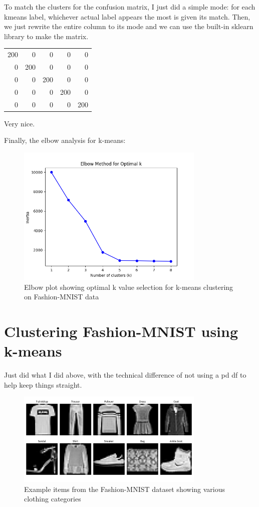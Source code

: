 \documentclass[letterpaper, 11pt]{amsart}
\begin{document}
To match the clusters for the confusion matrix, I just did a simple mode: for each kmeans label, whichever actual label appears the most is given its match.
Then, we just rewrite the entire column to its mode and we can use the built-in sklearn library to make the matrix.

\begin{tabular}{rrrrr}
\toprule
\midrule
200 & 0 & 0 & 0 & 0 \\
0 & 200 & 0 & 0 & 0 \\
0 & 0 & 200 & 0 & 0 \\
0 & 0 & 0 & 200 & 0 \\
0 & 0 & 0 & 0 & 200 \\
\bottomrule
\end{tabular}

Very nice.

Finally, the elbow analysis for k-means:
\begin{figure}[h]
\centering
\includegraphics[width=0.8\textwidth]{plots/elbow_plot.png}
\caption{Elbow plot showing optimal k value selection for k-means clustering on Fashion-MNIST data}
\end{figure}


\section{Clustering Fashion-MNIST using k-means}

Just did what I did above, with the technical difference of not using a pd df to help keep things straight.

\begin{figure}[h]
\centering
\includegraphics[width=0.8\textwidth]{plots/examble_items_fashion.png}
\caption{Example items from the Fashion-MNIST dataset showing various clothing categories}
\end{figure}
\end{document}
